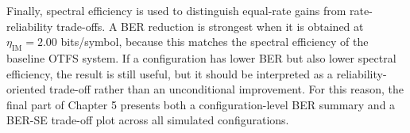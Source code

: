 Finally, spectral efficiency is used to distinguish equal-rate gains from rate-reliability trade-offs. A BER reduction is strongest when it is obtained at \(\eta_{\mathrm{IM}}=2.00\) bits/symbol, because this matches the spectral efficiency of the baseline OTFS system. If a configuration has lower BER but also lower spectral efficiency, the result is still useful, but it should be interpreted as a reliability-oriented trade-off rather than an unconditional improvement. For this reason, the final part of Chapter 5 presents both a configuration-level BER summary and a BER-SE trade-off plot across all simulated configurations.

